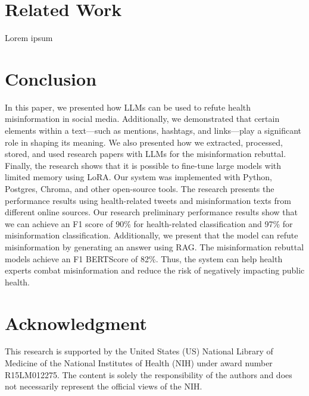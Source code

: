 \section{Related Work}

Lorem ipsum

\section{Conclusion}
In this paper, we presented how LLMs can be used to refute health misinformation in social media. Additionally, we demonstrated that certain elements within a text—such as mentions, hashtags, and links—play a significant role in shaping its meaning. We also presented how we extracted, processed, stored, and used research papers with LLMs for the misinformation rebuttal. Finally, the research shows that it is possible to fine-tune large models with limited memory using LoRA. Our system was implemented with Python, Postgres, Chroma, and other open-source tools. The research presents the performance results using health-related tweets and misinformation texts from different online sources. Our research preliminary performance results show that we can achieve an F1 score of 90\% for health-related classification and 97\% for misinformation classification. Additionally, we present that the model can refute misinformation by generating an answer using RAG. The misinformation rebuttal models achieve an F1 BERTScore of 82\%. Thus, the system can help health experts combat misinformation and reduce the risk of negatively impacting public health.

\section{Acknowledgment}
This research is supported by the United States (US) National Library of Medicine of the National Institutes of Health (NIH) under award number R15LM012275. The content is solely the responsibility of the authors and does not necessarily represent the official views of the NIH.

